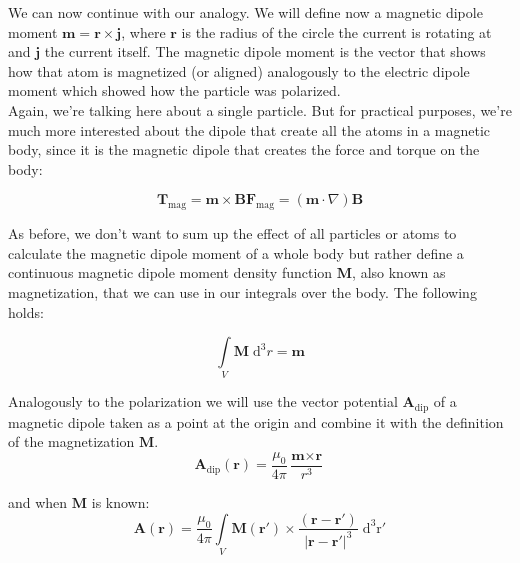 We can now continue with our analogy. We will define now a magnetic dipole moment $\textbf{m} = \textbf{r} \times \textbf{j} $, where $\textbf{r}$ is the radius of the circle the current is rotating at and $\textbf{j}$ the current itself.  The magnetic dipole moment is the vector that shows how that atom is magnetized (or aligned) analogously to the electric dipole moment which showed how the particle was polarized.\\

Again, we're talking here about a single particle. But for practical purposes, we're much more interested about the dipole that create all the atoms in a magnetic body, since it is the magnetic dipole that creates the force and torque on the body:

\begin{subequations}
\begin{equation}\label{eq:magdiptorque}
\textbf{T}_\text{mag} = \textbf{m}\times\textbf{B}
\end{equation}
\begin{equation}\label{eq:magdiptorque}
\textbf{F}_\text{mag} = (\textbf{m}\cdot\nabla)\textbf{B}
\end{equation}
\end{subequations}

As before, we don't want to sum up the effect of all particles or atoms to calculate the magnetic dipole moment of a whole body but rather define a continuous magnetic dipole moment density function $\textbf{M}$, also known as magnetization, that we can use in our integrals over the body. The following holds:

\begin{equation}
\int\limits_V \textbf{M} \;\mathrm{d}^3r = \textbf{m}
\end{equation}

Analogously to the polarization we will use the vector potential $\textbf{A}_\text{dip}$ of a magnetic dipole taken as a point at the origin and combine it with the definition of the magnetization $\textbf{M}$.\\
 
\begin{equation}
\textbf{A}_\text{dip}(\textbf{r}) = \frac{\mu_0}{4\pi} \frac{\textbf{m}\times\textbf{r}}{r^3}
\end{equation}

and when $\textbf{M}$ is known:
\begin{equation}
\textbf{A}(\textbf{r}) = \frac{\mu_0}{4\pi}\int\limits_V \textbf{M}(\textbf{r}')\times\frac{(\textbf{r}-\textbf{r}')}{|\textbf{r}-\textbf{r}'|^3}\; \mathrm{d^3r'}
\end{equation}

